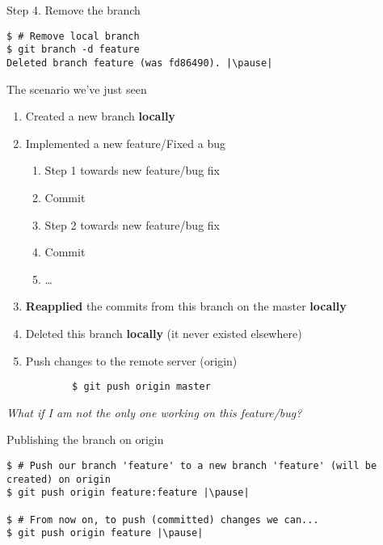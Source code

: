 \begin{frame}[fragile]{Step 4. Remove the branch}
  	\begin{lstlisting}
$ # Remove local branch
$ git branch -d feature
Deleted branch feature (was fd86490). |\pause|
	\end{lstlisting}
\end{frame}


\begin{frame}[fragile]{The scenario we've just seen}
	\begin{enumerate}
		\item Created a new branch \textbf{locally}
		\item Implemented a new feature/Fixed a bug
		\begin{enumerate}
			\item Step 1 towards new feature/bug fix
			\item Commit
			\item Step 2 towards new feature/bug fix
			\item Commit
			\item \ldots
		\end{enumerate}
		\item \textbf{Reapplied} the commits from this branch on the master \textbf{locally}
		\item Deleted this branch \textbf{locally} (it never existed elsewhere)
		\pause
		\item Push changes to the remote server (origin)
		\begin{lstlisting}
		$ git push origin master
		\end{lstlisting}
	\end{enumerate}
	\pause
	\textit{What if I am not the only one working on this feature/bug?}
\end{frame}

\begin{frame}[fragile]{Publishing the branch on origin}
	\begin{lstlisting}
$ # Push our branch 'feature' to a new branch 'feature' (will be created) on origin
$ git push origin feature:feature |\pause|

$ # From now on, to push (committed) changes we can...
$ git push origin feature |\pause|
	\end{lstlisting}
\end{frame}

